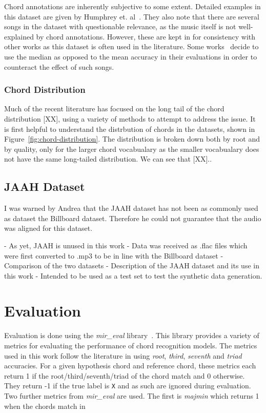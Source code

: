Chord annotations are inherently subjective to some extent. Detailed examples in this dataset are given by Humphrey et. al~\cite{FourTimelyInsights}. They also note that there are several songs in the dataset with questionable relevance, as the music itself is not well-explained by chord annotations. However, these are kept in for consistency with other works as this dataset is often used in the literature. Some works~\cite{StructuredTraining} decide to use the median as opposed to the mean accuracy in their evaluations in order to counteract the effect of such songs.

\subsubsection{Chord Distribution}

Much of the recent literature has focused on the long tail of the chord distribution [XX], using a variety of methods to attempt to address the issue. It is first helpful to understand the distrbution of chords in the datasets, shown in Figure~\ref{fig:chord-distribution}. The distribution is broken down both by root and by quality, only for the larger chord vocabualary as the smaller vocabualary does not have the same long-tailed distribution. We can see that [XX]..


\subsection{JAAH Dataset}
I was warned by Andrea that the JAAH dataset has not been as commonly used as dataset the Billboard dataset. Therefore he could not guarantee that the audio was aligned for this dataset.

- As yet, JAAH is unused in this work
- Data was received as .flac files which were first converted to .mp3 to be in line with the Billboard dataset
- Comparison of the two datasets
- Description of the JAAH dataset and its use in this work
- Intended to be used as a test set to test the synthetic data generation.

\section{Evaluation}
 
Evaluation is done using the \emph{mir\_eval} library~\cite{mir_eval}. This library provides a variety of metrics for evaluating the performance of chord recognition models. The metrics used in this work follow the literature in using \emph{root}, \emph{third}, \emph{seventh} and \emph{triad} accuracies. For a given hypothesis chord and reference chord, these metrics each return 1 if the root/third/seventh/triad of the chord match and 0 otherwise. They return -1 if the true label is \texttt{X} and as such are ignored during evaluation. Two further metrics from \emph{mir\_eval} are used. The first is \emph{majmin} which returns 1 when the chords match in  

